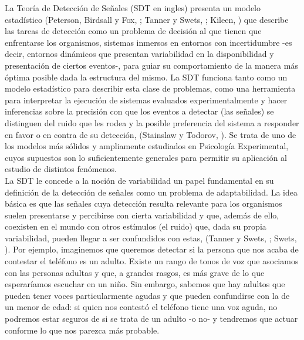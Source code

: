 La Teoría de Detección de Señales (SDT en ingles) presenta un modelo estadístico (Peterson, Birdsall y Fox, \citeyear{Peterson1953}; Tanner y Swets, \citeyear{Tanner1954}; Kileen, \citeyear{Killeen2014}) que describe las tareas de detección como un problema de decisión al que tienen que enfrentarse los organismos, sistemas inmersos en entornos con incertidumbre -es decir, entornos dinámicos que presentan variabilidad en la disponibilidad y presentación de ciertos eventos-, para guiar su comportamiento de la manera más óptima posible dada la estructura del mismo. La SDT funciona tanto como un modelo estadístico para describir esta clase de problemas, como una herramienta para interpretar la ejecución de sistemas evaluados experimentalmente y hacer inferencias sobre la precisión con que los eventos a detectar (las señales) se distinguen del ruido que les rodea y la posible preferencia del sistema a responder en favor o en contra de su detección, (Stainslaw y Todorov, \citeyear{Stainslaw1999}). Se trata de uno de los modelos más sólidos y ampliamente estudiados en Psicología Experimental, cuyos supuestos son lo suficientemente generales para permitir su aplicación al estudio de distintos fenómenos. \\

La SDT le concede a la noción de variabilidad un papel fundamental en su definición de la detección de señales como un problema de adaptabilidad. La idea básica es que las señales cuya detección resulta relevante para los organismos suelen presentarse y percibirse con cierta variabilidad y que, además de ello, coexisten en el mundo con otros estímulos (el ruido) que, dada su propia variabilidad, pueden llegar a ser confundidos con estas, (Tanner y Swets, \citeyear{Tanner1954}; Swets, \citeyear{Swets1973}). Por ejemplo, imaginemos que queremos detectar si la persona que nos acaba de contestar el teléfono es un adulto. Existe un rango de tonos de voz que asociamos con las personas adultas y que, a grandes rasgos, es más grave de lo que esperaríamos escuchar en un niño. Sin embargo, sabemos que hay adultos que pueden tener voces particularmente agudas y que pueden confundirse con la de un menor de edad: si quien nos contestó el teléfono tiene una voz aguda, no podremos estar seguros de si se trata de un adulto -o no- y tendremos que actuar conforme lo que nos parezca más probable.\\

